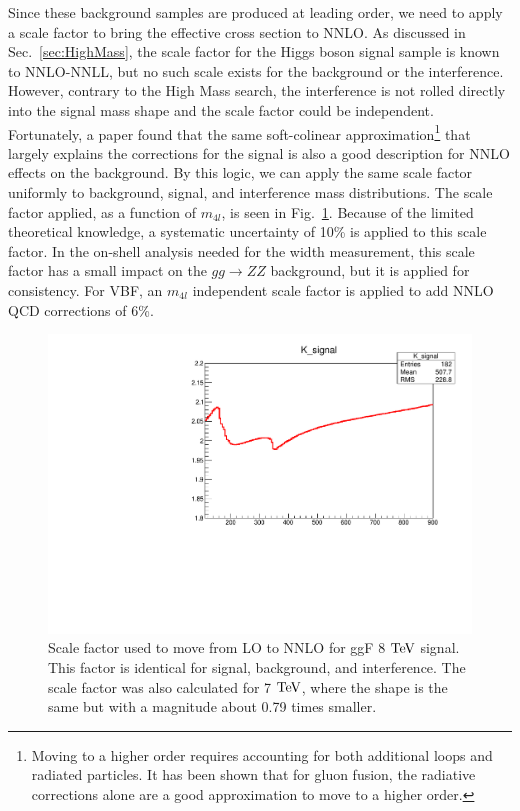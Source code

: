 Since these background samples are produced at leading order, we need to apply a scale factor to bring the effective cross section to NNLO. As discussed in Sec.~\ref{sec:HighMass}, the scale factor for the Higgs boson signal sample is known to NNLO-NNLL, but no such scale exists for the background or the interference. However, contrary to the High Mass search, the interference is not rolled directly into the signal mass shape and the scale factor could be independent. Fortunately, a paper \cite{Bonvini:1304.3053} found that the same soft-colinear approximation\footnote{Moving to a higher order requires accounting for both additional loops and radiated particles. It has been shown \cite{Kramer:1998} that for gluon fusion, the radiative corrections alone are a good approximation to move to a higher order.} that largely explains the corrections for the signal is also a good description for NNLO effects on the background. By this logic, we can apply the same scale factor uniformly to background, signal, and interference mass distributions. The scale factor applied, as a function of $m_{4l}$, is seen in Fig.~\ref{fig:KFactorggF}. Because of the limited theoretical knowledge, a systematic uncertainty of 10\% is applied to this scale factor. In the on-shell analysis needed for the width measurement, this scale factor has a small impact on the $gg\rightarrow ZZ$ background, but it is applied for consistency. For VBF, an $m_{4l}$ independent scale factor is applied to add NNLO QCD corrections of 6\%.

\begin{figure}[htbp]
\begin{center}
\includegraphics[width=.5\linewidth]{HiggsProperties/figures/kfactorpassa.pdf}
\caption[NNLO/LO Scale Factor at 8 $\rm{TeV}$ for ggF Signal]{Scale factor used to move from LO to NNLO for ggF 8 $\rm{TeV}$ signal. This factor is identical for signal, background, and interference. The scale factor was also calculated for 7 $\rm{TeV}$, where the shape is the same but with a magnitude about 0.79 times smaller.}
\label{fig:KFactorggF}
\end{center}
\end{figure}

